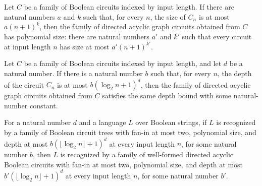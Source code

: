 \begin{theorem}
\label{BoolCircuit.TreeCircuitFamily.isPolySize_toDAG}
\leanok
{}
Let $C$ be a family of Boolean circuits indexed by input length. If there are natural
numbers $a$ and $k$ such that, for every $n$, the size of $C_n$ is at most $a(n+1)^k$,
then the family of directed acyclic graph circuits obtained from $C$ has polynomial
size: there are natural numbers $a'$ and $k'$ such that every circuit at input length
$n$ has size at most $a'(n+1)^{k'}$.
\end{theorem}

\begin{theorem}
\label{BoolCircuit.TreeCircuitFamily.hasPolylogDepth_toDAG}
\leanok
{}
Let $C$ be a family of Boolean circuits indexed by input length, and let $d$ be a
natural number. If there is a natural number $b$ such that, for every $n$, the depth of
the circuit $C_n$ is at most $b(\log_2 n+1)^d$, then the family of directed acyclic
graph circuits obtained from $C$ satisfies the same depth bound with some natural-number
constant.
\end{theorem}

\begin{theorem}
\label{Language.InTreeNC.inNC}
\leanok
{}
For a natural number $d$ and a language $L$ over Boolean strings, if $L$ is recognized
by a family of Boolean circuit trees with fan-in at most two, polynomial size, and depth
at most $b(\lfloor\log_2 n\rfloor+1)^d$ at every input length $n$, for some natural
number $b$, then $L$ is recognized by a family of well-formed directed acyclic Boolean
circuits with fan-in at most two, polynomial size, and depth at most $b'(\lfloor\log_2
n\rfloor+1)^d$ at every input length $n$, for some natural number $b'$.
\end{theorem}

